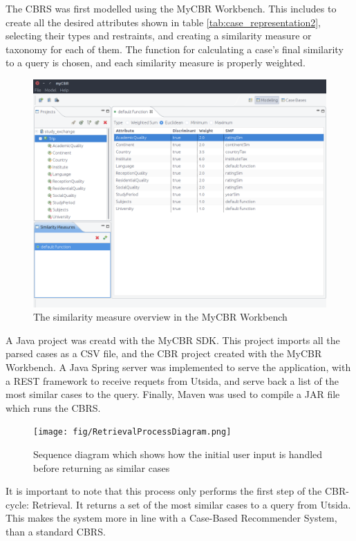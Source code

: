 The CBRS was first modelled using the MyCBR Workbench. This includes to create all the desired attributes shown in table \ref{tab:case_representation2}, selecting their types and restraints, and creating a similarity measure or taxonomy for each of them. The function for calculating a case's final similarity to a query is chosen, and each similarity measure is properly weighted.

\begin{figure}[H]
    \label{fig:workbench_exmaple}
    \centering
    \includegraphics[width=1\textwidth]{fig/cbr_model.png}
    \caption{The similarity measure overview in the MyCBR Workbench}
\end{figure}

A Java project was creatd with the MyCBR SDK. This project imports all the parsed cases as a CSV file, and the CBR project created with the MyCBR Workbench. A Java Spring server was implemented to serve the application, with a REST framework to receive requets from Utsida, and serve back a list of the most similar cases to the query. Finally, Maven was used to compile a JAR file which runs the CBRS. 

\begin{figure}[h]
    \label{fig:retrieval_process_diagram}
    \centering
    \texttt{[image: fig/RetrievalProcessDiagram.png]}
    \caption{Sequence diagram which shows how the initial user input is handled before returning as similar cases}
\end{figure}

It is important to note that this process only performs the first step of the CBR-cycle: Retrieval. It returns a set of the most similar cases to a query from Utsida. This makes the system more in line with a Case-Based Recommender System, than a standard CBRS. 


